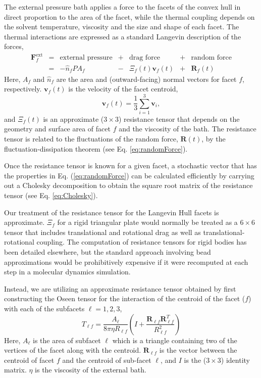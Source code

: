 \documentclass[]{book}
\begin{document}
The external pressure bath applies a force to the facets of the convex
hull in direct proportion to the area of the facet, while the thermal
coupling depends on the solvent temperature, viscosity and the size
and shape of each facet. The thermal interactions are expressed as a
standard Langevin description of the forces,
\begin{equation}
\begin{array}{rclclcl}
{\mathbf F}_f^{\text{ext}} & = &  \text{external pressure} & + & \text{drag force} & + & \text{random force} \\
& = &  -\hat{n}_f P A_f  & - & \Xi_f(t) {\mathbf v}_f(t)  & + & {\mathbf R}_f(t)
\end{array}
\end{equation}
Here, $A_f$ and $\hat{n}_f$ are the area and (outward-facing) normal
vectors for facet $f$, respectively.  ${\mathbf v}_f(t)$ is the
velocity of the facet centroid,
\begin{equation}
{\mathbf v}_f(t) =  \frac{1}{3} \sum_{i=1}^{3} {\mathbf v}_i,
\end{equation}
and $\Xi_f(t)$ is an approximate ($3 \times 3$) resistance tensor that
depends on the geometry and surface area of facet $f$ and the
viscosity of the bath.  The resistance tensor is related to the
fluctuations of the random force, $\mathbf{R}(t)$, by the
fluctuation-dissipation theorem (see Eq. \ref{eq:randomForce}).

Once the resistance tensor is known for a given facet, a stochastic
vector that has the properties in Eq. (\ref{eq:randomForce}) can be
calculated efficiently by carrying out a Cholesky decomposition to
obtain the square root matrix of the resistance tensor (see
Eq. \ref{eq:Cholesky}).

Our treatment of the resistance tensor for the Langevin Hull facets is
approximate.  $\Xi_f$ for a rigid triangular plate would normally be
treated as a $6 \times 6$ tensor that includes translational and
rotational drag as well as translational-rotational coupling. The
computation of resistance tensors for rigid bodies has been detailed
elsewhere,\cite{JoseGarciadelaTorre02012000,Garcia-de-la-Torre:2001wd,GarciadelaTorreJ2002,Sun:2008fk}
but the standard approach involving bead approximations would be
prohibitively expensive if it were recomputed at each step in a
molecular dynamics simulation.

Instead, we are utilizing an approximate resistance tensor obtained by
first constructing the Oseen tensor for the interaction of the
centroid of the facet ($f$) with each of the subfacets $\ell=1,2,3$,
\begin{equation}
T_{\ell f}=\frac{A_\ell}{8\pi\eta R_{\ell f}}\left(I +
  \frac{\mathbf{R}_{\ell f}\mathbf{R}_{\ell f}^T}{R_{\ell f}^2}\right)
\end{equation}
Here, $A_\ell$ is the area of subfacet $\ell$ which is a triangle
containing two of the vertices of the facet along with the centroid.
$\mathbf{R}_{\ell f}$ is the vector between the centroid of facet $f$
and the centroid of sub-facet $\ell$, and $I$ is the ($3 \times 3$)
identity matrix.  $\eta$ is the viscosity of the external bath.
\end{document}
